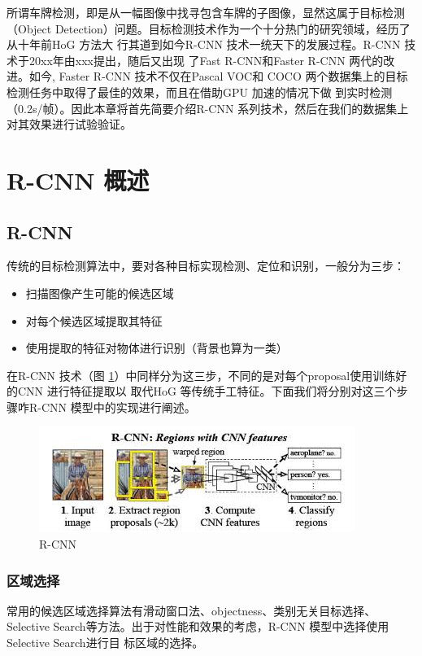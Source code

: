 所谓车牌检测，即是从一幅图像中找寻包含车牌的子图像，显然这属于目标检测（Object
Detection）问题。目标检测技术作为一个十分热门的研究领域，经历了从十年前HoG 方法大
行其道到如今R-CNN 技术一统天下的发展过程。R-CNN 技术于20xx年由xxx提出，随后又出现
了Fast R-CNN和Faster R-CNN 两代的改进。如今, Faster R-CNN 技术不仅在Pascal VOC和
COCO 两个数据集上的目标检测任务中取得了最佳的效果，而且在借助GPU 加速的情况下做
到实时检测（0.2s/帧）。因此本章将首先简要介绍R-CNN 系列技术，然后在我们的数据集上
对其效果进行试验验证。

\section{R-CNN 概述}

\subsection{R-CNN}

传统的目标检测算法中，要对各种目标实现检测、定位和识别，一般分为三步：

\begin{itemize}
  \item 扫描图像产生可能的候选区域
  \item 对每个候选区域提取其特征
  \item 使用提取的特征对物体进行识别（背景也算为一类）
\end{itemize}

在R-CNN 技术（图 \ref{Fig:RCNN}）中同样分为这三步，不同的是对每个proposal使用训练好的CNN 进行特征提取以
取代HoG 等传统手工特征。下面我们将分别对这三个步骤咋R-CNN 模型中的实现进行阐述。

\begin{figure}
  \centering
  \includegraphics[width=0.8\linewidth]{./Figure/RCNN.jpg}
  \caption{R-CNN}\label{Fig:RCNN}
\end{figure}

\subsubsection{区域选择}

常用的候选区域选择算法有滑动窗口法、objectness、类别无关目标选择、Selective
Search等方法。出于对性能和效果的考虑，R-CNN 模型中选择使用 Selective Search进行目
标区域的选择。

